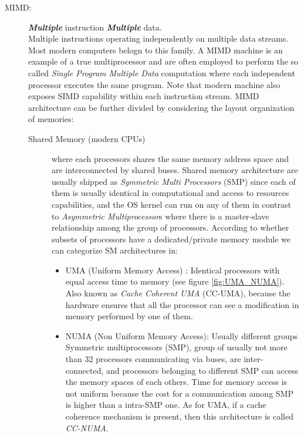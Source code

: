 \begin{description}
\item[MIMD:] \textit{\textbf{Multiple}} instruction \textit{\textbf{Multiple}} data. \hfill \\
Multiple instructions operating independently on multiple data streams.
Most modern computers belogn to this family. A MIMD machine is an example of a true multiprocessor and are often employed to perform the so called \textit{Single Program Multiple Data} computation where each independent processor executes the same program.
Note that modern machine also exposes SIMD capability within each instruction stream.
MIMD architecture can be further divided by considering the  layout organization of memories:
\begin{description}
	\item [Shared Memory (modern CPUs)] where each processors shares the same memory address space and are interconnected by shared buses. 
	Shared memory architecture are usually shipped as \textit{Symmetric Multi Processors} (SMP) since each of them is usually identical in computational and access to resources capabilities, and the OS kernel can run on any of them in contrast to \textit{Asymmetric Multiprocessor}s where there is a master-slave relationship  among the group of processors.
	According to whether subsets of processors have a dedicated/private memory module we can categorize SM architectures in:	
	\begin{itemize}
		\item UMA (Uniform Memory Access) : Identical processors with equal
		access time to memory (see figure \ref{fig:UMA_NUMA}).
		Also known as \textit{Cache Coherent UMA} (CC-UMA), because the
		hardware ensures that all the processor can see a modification in memory performed by one of them.
		\item NUMA (Non Uniform Memory Access): Usually different groups
		 Symmetric multiprocessors (SMP), group of usually not more than 32 processors communicating via buses, are inter-connected, and processors belonging to different SMP can access the memory spaces of each others. Time for memory access is not uniform because the cost for a communication among SMP is higher than a intra-SMP one.
		 As for UMA, if a cache coherence mechanism  is present, then this architecture is called \textit{CC-NUMA}.
		 \begin{figure}[b]
			\caption[Shared memory architectures.]{UMA and NUMA shared memory architecture.}
			\label{fig:UMA_NUMA}
			\centering
			\begin{subfigure}[b]{0.5\textwidth}

\end{subfigure}
\end{figure}
\end{itemize}
\end{description}
\end{description}
